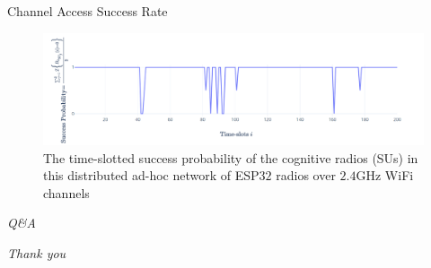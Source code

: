 \documentclass{beamer}
\begin{document}
\begin{frame}{Channel Access Success Rate}
    \begin{figure}
    \centering
    \includegraphics[width = 1.0\textwidth]{ESP32_Success_Probability.PNG}
    \caption{The time-slotted success probability of the cognitive radios (SUs) in this distributed ad-hoc network of ESP$32$ radios over $2.4$GHz WiFi channels}
    \label{fig:36}
\end{figure}
\end{frame}
\begin{frame}{}
  \centering \Huge
  \emph{Q\&A}
\end{frame}
\begin{frame}{}
  \centering \Huge
  \emph{Thank you}
\end{frame}
\end{document}
